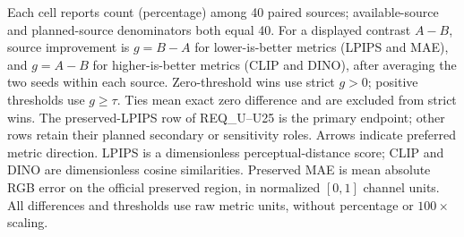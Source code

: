 \begin{table}[!t]
\begin{minipage}{6.9in}
{\raggedright Each cell reports count (percentage) among 40 paired sources; available-source and planned-source denominators both equal 40. For a displayed contrast $A-B$, source improvement is $g=B-A$ for lower-is-better metrics (LPIPS and MAE), and $g=A-B$ for higher-is-better metrics (CLIP and DINO), after averaging the two seeds within each source. Zero-threshold wins use strict $g>0$; positive thresholds use $g\geq\tau$. Ties mean exact zero difference and are excluded from strict wins. The preserved-LPIPS row of REQ\_U--U25 is the primary endpoint; other rows retain their planned secondary or sensitivity roles. Arrows indicate preferred metric direction. LPIPS is a dimensionless perceptual-distance score; CLIP and DINO are dimensionless cosine similarities. Preserved MAE is mean absolute RGB error on the official preserved region, in normalized $[0,1]$ channel units. All differences and thresholds use raw metric units, without percentage or $100\times$ scaling.\par}
\end{minipage}
\end{table}
